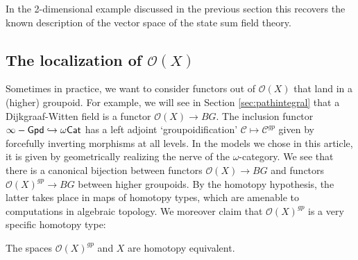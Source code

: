 In the 2-dimensional example discussed in the previous section this recovers the known description of the vector space of the state sum field theory.


\subsection{The localization of $\mathcal{O}(X)$}
\label{sec:groupoidify}

Sometimes in practice, we want to consider functors out of $\mathcal{O}(X)$ that land in a (higher) groupoid.
For example, we will see in Section \ref{sec:pathintegral} that a Dijkgraaf-Witten field is a functor $\mathcal{O}(X) \to BG$.
The inclusion functor $\infty-\mathsf{Gpd} \hookrightarrow \omega\mathsf{Cat}$ has a left adjoint `groupoidification' $\mathcal{C} \mapsto \mathcal{C}^{gp}$ given by forcefully inverting morphisms at all levels.
In the models we chose in this article, it is given by geometrically realizing the nerve of the $\omega$-category.
We see that there is a canonical bijection between functors $\mathcal{O}(X) \to BG$ and functors $\mathcal{O}(X)^{gp} \to BG$ between higher groupoids.
By the homotopy hypothesis, the latter takes place in maps of homotopy types, which are amenable to computations in algebraic topology.
We moreover claim that $\mathcal{O}(X)^{gp}$ is a very specific homotopy type:

\begin{lemma}
    The spaces $\mathcal{O}(X)^{gp}$ and $X$ are homotopy equivalent.
\end{lemma}

